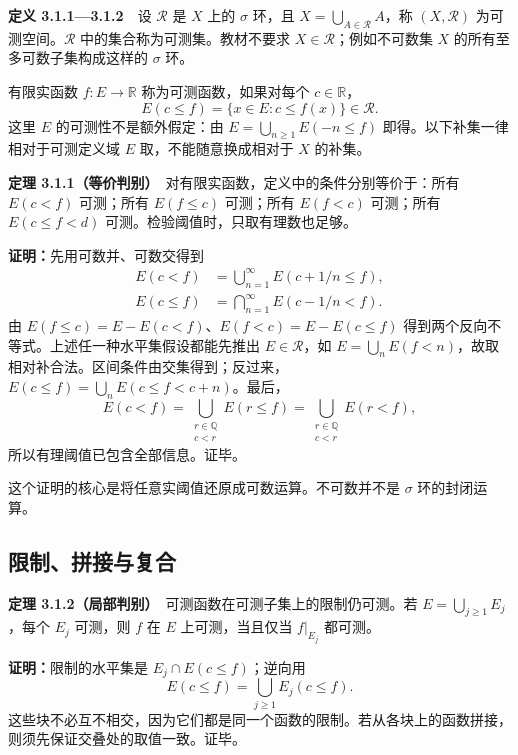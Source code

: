 \documentclass[11pt,a4paper]{article}
\begin{document}
\textbf{定义 3.1.1---3.1.2}　设 \(\mathcal R\) 是 \(X\) 上的 \(\sigma\)
环，且 \(X=\bigcup_{A\in\mathcal R}A\)，称 \((X,\mathcal R)\)
为可测空间。\(\mathcal R\) 中的集合称为可测集。教材不要求
\(X\in\mathcal R\)；例如不可数集 \(X\) 的所有至多可数子集构成这样的
\(\sigma\) 环。

有限实函数 \(f:E\to\mathbb R\) 称为可测函数，如果对每个
\(c\in\mathbb R\)， \[
E(c\le f)=\{x\in E:c\le f(x)\}\in\mathcal R.
\] 这里 \(E\) 的可测性不是额外假定：由 \(E=\bigcup_{n\ge1}E(-n\le f)\)
即得。以下补集一律相对于可测定义域 \(E\) 取，不能随意换成相对于 \(X\)
的补集。

\textbf{定理
3.1.1（等价判别）}　对有限实函数，定义中的条件分别等价于：所有
\(E(c<f)\) 可测；所有 \(E(f\le c)\) 可测；所有 \(E(f<c)\) 可测；所有
\(E(c\le f<d)\) 可测。检验阈值时，只取有理数也足够。

\textbf{证明：}先用可数并、可数交得到 \[
\begin{aligned}
E(c<f)&=\bigcup_{n=1}^{\infty}E(c+1/n\le f),\\
E(c\le f)&=\bigcap_{n=1}^{\infty}E(c-1/n<f).
\end{aligned}
\] 由 \(E(f\le c)=E-E(c<f)\)、\(E(f<c)=E-E(c\le f)\)
得到两个反向不等式。上述任一种水平集假设都能先推出
\(E\in\mathcal R\)，如
\(E=\bigcup_n E(f<n)\)，故取相对补合法。区间条件由交集得到；反过来，\(E(c\le f)=\bigcup_n E(c\le f<c+n)\)。最后，
\[
E(c<f)=\bigcup_{\substack{r\in\mathbb Q\\c<r}}E(r\le f)
       =\bigcup_{\substack{r\in\mathbb Q\\c<r}}E(r<f),
\] 所以有理阈值已包含全部信息。证毕。

这个证明的核心是将任意实阈值还原成可数运算。不可数并不是 \(\sigma\)
环的封闭运算。

\subsection*{限制、拼接与复合}\label{ux9650ux5236ux62fcux63a5ux4e0eux590dux5408}

\textbf{定理 3.1.2（局部判别）}　可测函数在可测子集上的限制仍可测。若
\(E=\bigcup_{j\ge1}E_j\)，每个 \(E_j\) 可测，则 \(f\) 在 \(E\)
上可测，当且仅当 \(f|_{E_j}\) 都可测。

\textbf{证明：}限制的水平集是 \(E_j\cap E(c\le f)\)；逆向用 \[
E(c\le f)=\bigcup_{j\ge1}E_j(c\le f).
\]
这些块不必互不相交，因为它们都是同一个函数的限制。若从各块上的函数拼接，则须先保证交叠处的取值一致。证毕。
\end{document}
